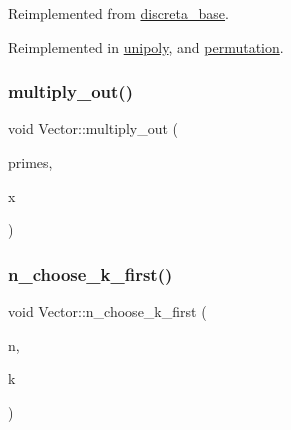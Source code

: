 Reimplemented from \mbox{\hyperlink{classdiscreta__base_a54d5c16c016769e3365639721c06591e}{discreta\+\_\+base}}.



Reimplemented in \mbox{\hyperlink{classunipoly_a95bf7f347a5630f0d3f9737ffe22a341}{unipoly}}, and \mbox{\hyperlink{classpermutation_abbd320f211ed730261c31fecd5a567bb}{permutation}}.

\mbox{\label{class_vector_a3f8219c2cb731ff22790f6456753e104}} 
\subsubsection{\texorpdfstring{multiply\+\_\+out()}{multiply\_out()}}
{\footnotesize\ttfamily void Vector\+::multiply\+\_\+out (\begin{DoxyParamCaption}\item[{\mbox{\hyperlink{class_vector}{Vector}} \&}]{primes,  }\item[{\mbox{\hyperlink{classdiscreta__base}{discreta\+\_\+base}} \&}]{x }\end{DoxyParamCaption})}

\mbox{\label{class_vector_a6998131cab792d584242061c5f34d044}} 
\subsubsection{\texorpdfstring{n\+\_\+choose\+\_\+k\+\_\+first()}{n\_choose\_k\_first()}}
{\footnotesize\ttfamily void Vector\+::n\+\_\+choose\+\_\+k\+\_\+first (\begin{DoxyParamCaption}\item[{\mbox{\hyperlink{galois_8h_a09fddde158a3a20bd2dcadb609de11dc}{I\+NT}}}]{n,  }\item[{\mbox{\hyperlink{galois_8h_a09fddde158a3a20bd2dcadb609de11dc}{I\+NT}}}]{k }\end{DoxyParamCaption})}

\mbox{\label{class_vector_a05633c7bbd9e39595a634fe956263760}} 
